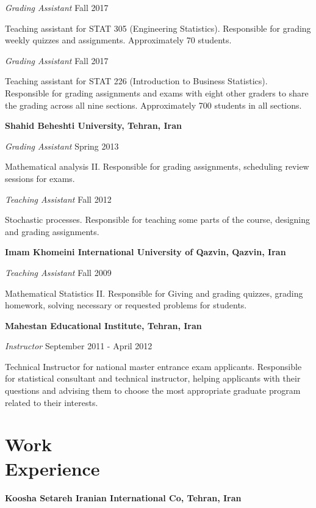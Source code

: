 \documentclass[margin,line]{res}
\begin{document}
\begin{resume}
{\em Grading Assistant} \hfill { Fall 2017}

\vspace{-.3cm}
Teaching assistant for STAT 305  (Engineering Statistics). Responsible for grading weekly quizzes and assignments. Approximately 70 students.

{\em Grading Assistant} \hfill { Fall 2017}

\vspace{-.3cm}
Teaching assistant for STAT 226  (Introduction to Business Statistics). Responsible for grading assignments and exams with eight other graders to share the grading across all nine sections. Approximately 700 students in all sections.


{\bf Shahid Beheshti University, Tehran, Iran}

{\em Grading Assistant} \hfill { Spring 2013}

\vspace{-.3cm}
Mathematical analysis II. Responsible for grading assignments, scheduling review sessions for exams. 

{\em Teaching Assistant} \hfill { Fall 2012}

\vspace{-.3cm}
Stochastic processes. Responsible for teaching some parts of the course, designing and grading assignments. 

{\bf Imam Khomeini International University of Qazvin, Qazvin, Iran}

{\em Teaching Assistant} \hfill { Fall 2009}

\vspace{-.3cm}
Mathematical Statistics II. Responsible for Giving and grading quizzes, grading homework, solving necessary or requested problems for students. 

{\bf Mahestan Educational Institute, Tehran, Iran}

\vspace{-.3cm}
{\em Instructor} \hfill { September 2011 - April 2012}

\vspace{-.3cm}
Technical Instructor for national master entrance exam applicants. Responsible for statistical consultant and technical instructor, helping applicants with their questions and advising them to choose the most appropriate graduate program related to their interests.


\section{\sc Work \\ Experience}
{\bf Koosha Setareh Iranian International Co, Tehran, Iran}



\end{resume}
\end{document}
